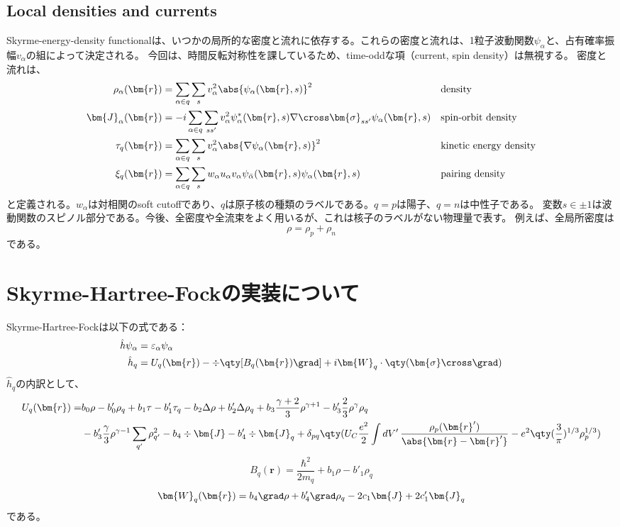 \documentclass[a4paper,11pt,uplatex]{jsarticle}%
\begin{document}
\subsection{Local densities and currents}
Skyrme-energy-density functionalは、いつかの局所的な密度と流れに依存する。これらの密度と流れは、1粒子波動関数$\psi_\alpha$と、占有確率振幅$v_\alpha$の組によって決定される。
今回は、時間反転対称性を課しているため、time-oddな項（current, spin density）は無視する。
密度と流れは、
\begin{align}
  \rho_\alpha(\bm{r})&=\sum_{\alpha\in q}\sum_{s}v_\alpha^2\abs{\psi_\alpha(\bm{r},s)}^2 & & \text{density}\\
  \bm{J}_\alpha(\bm{r})&=-i\sum_{\alpha\in q}\sum_{ss'}v_\alpha^2\psi^*_\alpha(\bm{r},s)\nabla\cross \bm{\sigma}_{ss'}\psi_\alpha(\bm{r},s) & & \text{spin-orbit density} \\
  \tau_q(\bm{r}) &= \sum_{\alpha\in q}\sum_{s}v_\alpha^2\abs{\nabla\psi_\alpha(\bm{r},s)}^2 & & \text{kinetic energy density} \\
  \xi_q(\bm{r}) &= \sum_{\alpha\in q}\sum_{s}w_\alpha u_\alpha v_\alpha \psi_{\bar{\alpha}}(\bm{r},s)\psi_\alpha(\bm{r},s) & & \text{pairing density} 
\end{align}
と定義される。$w_\alpha$は対相関のsoft cutoffであり、$q$は原子核の種類のラベルである。$q=p$は陽子、$q=n$は中性子である。
変数$s\in \pm 1$は波動関数のスピノル部分である。今後、全密度や全流束をよく用いるが、これは核子のラベルがない物理量で表す。
例えば、全局所密度は
\begin{equation}
  \rho = \rho_p + \rho_n
\end{equation}
である。

\section*{Skyrme-Hartree-Fockの実装について}
Skyrme-Hartree-Fockは以下の式である：
\begin{align}
  \hat{h}\psi_\alpha &= \varepsilon_\alpha\psi_\alpha \\
  \hat{h}_q &= U_q(\bm{r})-\div\qty[B_q(\bm{r})\grad]+i\bm{W}_q\cdot\qty(\bm{\sigma}\cross \grad)
\end{align}
$\hat{h}_q$の内訳として、
\begin{align}
  U_q(\bm{r}) =& b_0\rho - b'_0\rho_q + b_1\tau - b'_1\tau_q - b_2\Delta\rho + b'_2\Delta\rho_q + b_3\frac{\gamma+2}{3}\rho^{\gamma+1}-b'_3\frac{2}{3}\rho^{\gamma}\rho_q \notag\\
  & - b'_3\frac{\gamma}{3}\rho^{\gamma-1}\sum_{q'}\rho_{q'}^2 - b_4\div{\bm{J}}-b'_4\div{\bm{J}_q} + \delta_{pq}\qty(U_C\frac{e^2}{2}\int dV'\,\frac{\rho_p(\bm{r}')}{\abs{\bm{r}-\bm{r}'}}-e^2\qty(\frac{3}{\pi})^{1/3}\rho_p^{1/3})
\end{align}
\begin{equation}
  B_q(\bm{r}) = \frac{\hbar^2}{2m_q}+b_1\rho -b'_1\rho_q 
\end{equation}
\begin{equation}
  \bm{W}_q(\bm{r}) = b_4\grad\rho + b'_4\grad\rho_q - 2c_1\bm{J} + 2c'_1\bm{J}_q
\end{equation}
である。
\end{document}

